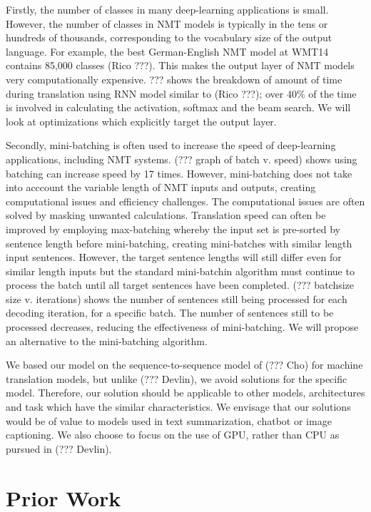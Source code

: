 \documentclass[]{article}
\begin{document}
Firstly, the number of classes in many deep-learning applications is small. However, the number of classes in NMT models is typically in the tens or hundreds of thousands, corresponding to the vocabulary size of the output language. For example, the best German-English NMT model at WMT14 contains 85,000 classes (Rico ???). This makes the output layer of NMT models very computationally expensive. ??? shows the breakdown of amount of time during translation using RNN model similar to (Rico ???); over 40\% of the time is involved in calculating the activation, softmax and the beam search. We will look at optimizations which explicitly target the output layer.

Secondly, mini-batching is often used to increase the speed of deep-learning applications, including NMT systems. (??? graph of batch v. speed) shows using batching can increase speed by 17 times. However, mini-batching does not take into acccount the variable length of NMT inputs and outputs, creating computational issues and efficiency challenges. The computational issues are often solved by masking unwanted calculations. Translation speed can often be improved by employing max-batching whereby the input set is pre-sorted by sentence length before mini-batching, creating mini-batches with similar length input sentences. However, the target sentence lengths will still differ even for similar length inputs but the standard mini-batchin algorithm must continue to process the batch until all target sentences have been completed. (??? batchsize size v. iterations) shows the number of sentences still being processed for each decoding iteration, for a specific batch. The number of sentences still to be processed decreases, reducing the effectiveness of mini-batching. We will propose an alternative to the mini-batching algorithm.

We based our model on the sequence-to-sequence model of (??? Cho) for machine translation models, but unlike (??? Devlin), we avoid solutions for the specific model. Therefore, our solution should be applicable to other models, architectures and task which have the similar characteristics. We envisage that our solutions would be of value to models used in text summarization, chatbot or image captioning. We also choose to focus on the use of GPU, rather than CPU as pursued in (??? Devlin).

\section{Prior Work}
\end{document}
